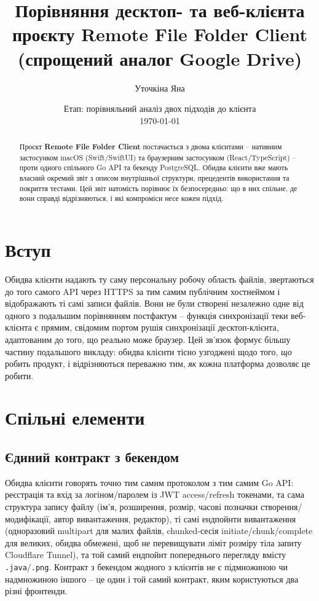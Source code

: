 \documentclass[12pt,a4paper]{article}
\title{\textbf{Порівняння десктоп- та веб-клієнта\\[2pt] \large проєкту Remote File Folder Client\\(спрощений аналог Google Drive)}}
\author{Уточкіна Яна}
\date{Етап: порівняльний аналіз двох підходів до клієнта \\ \today}
\begin{document}
\maketitle

\begin{abstract}
\noindent
Проєкт \textbf{Remote File Folder Client} постачається з двома клієнтами -- нативним застосунком macOS (Swift/SwiftUI) та браузерним застосунком (React/TypeScript) -- проти одного спільного Go API та бекенду PostgreSQL. Обидва клієнти вже мають власний окремий звіт з описом внутрішньої структури, прецедентів використання та покриття тестами. Цей звіт натомість порівнює їх безпосередньо: що в них спільне, де вони справді відрізняються, і які компроміси несе кожен підхід.
\end{abstract}

\tableofcontents
\newpage

\section{Вступ}

Обидва клієнти надають ту саму персональну робочу область файлів, звертаються до того самого API через HTTPS за тим самим публічним хостнеймом і відображають ті самі записи файлів. Вони не були створені незалежно одне від одного з подальшим порівнянням постфактум -- функція синхронізації теки веб-клієнта є прямим, свідомим портом рушія синхронізації десктоп-клієнта, адаптованим до того, що реально може браузер. Цей зв'язок формує більшу частину подальшого викладу: обидва клієнти тісно узгоджені щодо того, \emph{що} робить продукт, і відрізняються переважно тим, \emph{як} кожна платформа дозволяє це робити.

\section{Спільні елементи}

\subsection{Єдиний контракт з бекендом}

Обидва клієнти говорять точно тим самим протоколом з тим самим Go API: реєстрація та вхід за логіном/паролем із JWT access/refresh токенами, та сама структура запису файлу (ім'я, розширення, розмір, часові позначки створення/модифікації, автор вивантаження, редактор), ті самі ендпойнти вивантаження (одноразовий multipart для малих файлів, chunked-сесія initiate/chunk/complete для великих, обидва обмежені, щоб не перевищувати ліміт розміру тіла запиту Cloudflare Tunnel), та той самий ендпойнт попереднього перегляду вмісту \texttt{.java}/\texttt{.png}. Контракт з бекендом жодного з клієнтів не є підмножиною чи надмножиною іншого -- це один і той самий контракт, яким користуються два різні фронтенди.
\end{document}
